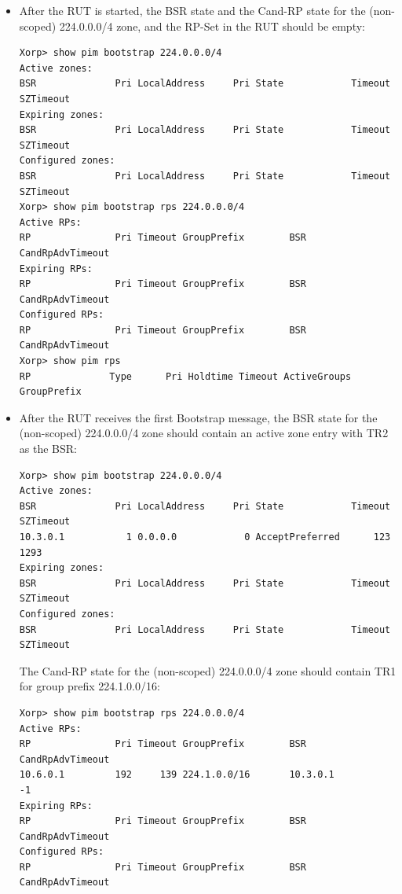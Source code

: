 \documentclass[11pt]{report}
\begin{document}
\begin{itemize}

  \item After the RUT is started, the BSR state and the Cand-RP state for the
 (non-scoped) 224.0.0.0/4 zone, and the RP-Set in the RUT should be empty:

\begin{verbatim}
Xorp> show pim bootstrap 224.0.0.0/4
Active zones:
BSR              Pri LocalAddress     Pri State            Timeout SZTimeout
Expiring zones:
BSR              Pri LocalAddress     Pri State            Timeout SZTimeout
Configured zones:
BSR              Pri LocalAddress     Pri State            Timeout SZTimeout
Xorp> show pim bootstrap rps 224.0.0.0/4
Active RPs:
RP               Pri Timeout GroupPrefix        BSR         CandRpAdvTimeout
Expiring RPs:
RP               Pri Timeout GroupPrefix        BSR         CandRpAdvTimeout
Configured RPs:
RP               Pri Timeout GroupPrefix        BSR         CandRpAdvTimeout
Xorp> show pim rps 
RP              Type      Pri Holdtime Timeout ActiveGroups GroupPrefix       
\end{verbatim}

  \item After the RUT receives the first Bootstrap message, the BSR state for
  the (non-scoped) 224.0.0.0/4 zone should contain an active zone entry with
  TR2 as the BSR:

\begin{verbatim}
Xorp> show pim bootstrap 224.0.0.0/4
Active zones:
BSR              Pri LocalAddress     Pri State            Timeout SZTimeout
10.3.0.1           1 0.0.0.0            0 AcceptPreferred      123      1293
Expiring zones:
BSR              Pri LocalAddress     Pri State            Timeout SZTimeout
Configured zones:
BSR              Pri LocalAddress     Pri State            Timeout SZTimeout
\end{verbatim}

  The Cand-RP state for the (non-scoped) 224.0.0.0/4 zone should contain TR1
  for group prefix 224.1.0.0/16:

\begin{verbatim}
Xorp> show pim bootstrap rps 224.0.0.0/4
Active RPs:
RP               Pri Timeout GroupPrefix        BSR         CandRpAdvTimeout
10.6.0.1         192     139 224.1.0.0/16       10.3.0.1                  -1
Expiring RPs:
RP               Pri Timeout GroupPrefix        BSR         CandRpAdvTimeout
Configured RPs:
RP               Pri Timeout GroupPrefix        BSR         CandRpAdvTimeout
\end{verbatim}


\end{itemize}
\end{document}
